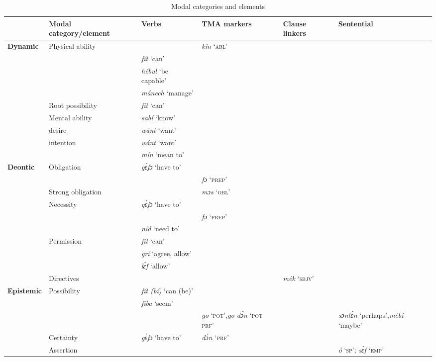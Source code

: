 \begin{sidewaystable}
\caption{Modal categories and elements}
\label{tab:key:6.8}
\footnotesize
\begin{tabularx}{\textwidth}{llQQQQ}
\lsptoprule
&Modal category/element & Verbs  & TMA markers & Clause linkers & Sentential \\
\midrule 
\textbf{Dynamic} & Physical ability &  & \textit{kin} {‘}{\textsc{abl’}} &  & \\
&& \textit{fít} {‘can’} &  &  & \\
&& \textit{hébul} {‘be capable’} &  &  & \\
&& \textit{mánech} {‘manage’} &  &  & \\
&Root possibility & \textit{fít} {‘can’} &  &  & \\
&Mental ability & \textit{sabí}{ ‘know’} &  &  & \\
&desire & \textit{wánt} {‘want’} &  &  & \\
&intention & \textit{wánt} {‘want’} &  &  & \\
&& \textit{mín} {‘mean to’} &  &  & \\

\midrule
\textbf{Deontic} &   Obligation & \textit{gɛ́fɔ} ‘have to’ &  &  & \\
&&  & \textit{fɔ} {‘}{\textsc{prep}}{’} &  & \\
&Strong obligation &  & \textit{mɔs} ‘\textsc{obl}’ &  & \\
&Necessity & \textit{gɛ́fɔ} ‘have to’ &  &  & \\
&&  & \textit{fɔ} {‘}{\textsc{prep}}{’} &  & \\
&& \textit{níd} {‘need to’} &  &  & \\
&Permission & \textit{fít} {‘can’} &  &  & \\
&& \textit{grí} {‘agree, allow}’ &  &  & \\
&& \textit{lɛ́f} ‘allow’ &  &  & \\
&Directives &  &  & \textit{mék} {‘}{\textsc{sbjv}}{’} & \\

\midrule
\textbf{Epistemic} & Possibility & \textit{fít (bí)} {‘can} {(be)’} &  &  & \\
&& \textit{fíba} {‘seem’} &  &  & \\
&&  & \textit{go} {‘}{\textsc{pot}}{’,}\newline  \textit{go dɔ́n}\textit{} {‘}{\textsc{pot}}{} {\textsc{prf}}{’} &  & \textit{sɔntɛ́n} ‘perhaps’,\newline  \textit{m\'ebi} ‘maybe’\\
&Certainty & \textit{gɛ́fɔ} ‘have to’ & \textit{dɔ́n} {‘}{\textsc{prf}}{’} &  & \\
&Assertion &  &  &  & \textit{ó} ‘\textsc{sp}’; \textit{sɛ́f} ‘\textsc{emp}’ \\


\end{tabularx}
\end{sidewaystable}
